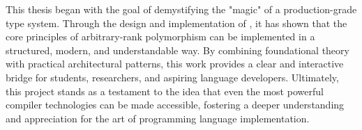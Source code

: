 \enlargethispage{\baselineskip}
This thesis began with the goal of demystifying the "magic" of a production-grade type system. Through the design and implementation of \Arralac, it has shown that the core principles of arbitrary-rank polymorphism can be implemented in a structured, modern, and understandable way. By combining foundational theory with practical architectural patterns, this work provides a clear and interactive bridge for students, researchers, and aspiring language developers. Ultimately, this project stands as a testament to the idea that even the most powerful compiler technologies can be made accessible, fostering a deeper understanding and appreciation for the art of programming language implementation.